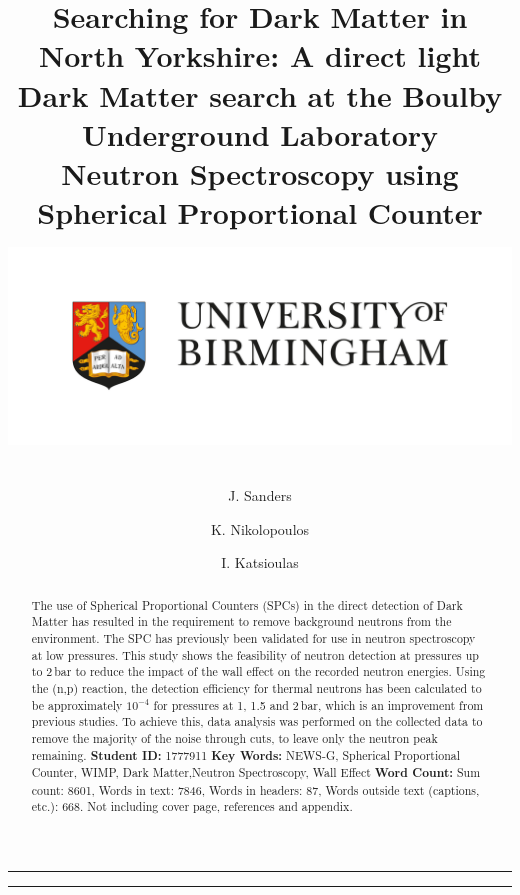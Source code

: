 \documentclass[a4paper]{article}
\title{\huge Searching for Dark Matter in North Yorkshire: A direct light Dark
Matter search at the Boulby Underground Laboratory\\ \bigskip  \LARGE Neutron Spectroscopy using Spherical Proportional Counter
\newline \includegraphics[height=6cm]{bham.png}}
\author[$\ssymbol{2}$]{J. Sanders}
\author[$\ssymbol{2}$]{K. Nikolopoulos}
\author[$\ssymbol{2}$]{I. Katsioulas}
\affil[$\ssymbol{2}$]{School of Physics and Astronomy, University of Birmingham,
Birmingham, B15 2TT, United Kingdom}
\begin{document}

\maketitle
\thispagestyle

\rule{411.8pt}{1pt}
\begin{abstract}
\noindent The use of Spherical Proportional Counters (SPCs) in the direct detection of Dark Matter has resulted in the requirement to remove background neutrons from the environment. The SPC has previously been validated for use in neutron spectroscopy at low pressures. This study shows the feasibility of neutron detection at pressures up to 2\,bar to reduce the impact of the wall effect on the recorded neutron energies. Using the (n,p) reaction, the detection efficiency for thermal neutrons has been calculated to be approximately $10^{-4}$ for pressures at 1, 1.5 and 2\,bar, which is an improvement from previous studies. To achieve this, data analysis was performed on the collected data to remove the majority of the noise through cuts, to leave only the neutron peak remaining. 
\newline\linebreak
\newline\textbf{Student ID:} 1777911
\newline\textbf{Key Words:} NEWS-G, Spherical Proportional Counter, WIMP, Dark Matter,Neutron Spectroscopy, Wall Effect
\newline\textbf{Word Count:} Sum count: 8601, Words in text: 7846, Words in headers: 87, Words outside text (captions, etc.): 668. Not including cover page, references and appendix.
\end{abstract}


\rule{411.8pt}{1pt}
\newpage
\setcounter{page}{1}
\tableofcontents
\newpage
\boldmath
\end{document}
